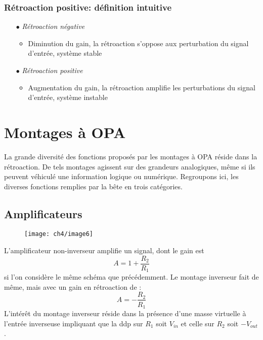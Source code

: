 		\subsubsection{Rétroaction positive: définition intuitive}
		\begin{itemize}
		\item[$\bullet$] \textit{Rétroaction négative}
			\begin{itemize}
			\item Diminution du gain, la rétroaction s'oppose aux 
			perturbation du signal d'entrée, système stable
			\end{itemize}
		\item[$\bullet$] \textit{Rétroaction positive}
			\begin{itemize}
			\item Augmentation du gain, la rétroaction amplifie les 
			perturbations du signal d'entrée, système instable
			\end{itemize}
		\end{itemize}

\section{Montages à OPA}
La grande diversité des fonctions proposés par les montages à OPA 
réside dans la rétroaction. De tels montages agissent sur des 
grandeurs analogiques, même si ils peuvent véhiculé une information 
logique ou numérique. Regroupons ici, les diverses fonctions remplies 
par la bête en trois catégories.
	
	\newpage
	\subsection{Amplificateurs}
	\begin{wrapfigure}[9]{l}{7.1cm}
	\vspace{-0.5cm}
	\texttt{[image: ch4/image6]}
	\end{wrapfigure}
	L'amplificateur non-inverseur amplifie un signal, dont le gain est
	\begin{equation}
	A = 1 + \dfrac{R_2}{R_1}
	\end{equation}
	si l'on considère le même schéma que précédemment. Le montage 
	inverseur fait de même, mais avec un gain en rétroaction 
	de :
	\begin{equation}
	A = -\dfrac{R_2}{R_1}
	\end{equation}
	L'intérêt du montage inverseur réside dans la présence d'une 
	masse virtuelle à l'entrée inverseuse impliquant que la ddp 
	sur $R_1$ soit $V_{in}$ et celle sur $R_2$ soit $-V_{out}$.\\
	
